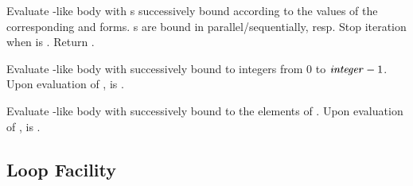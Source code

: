 \begin{LIST}{1cm}
  
  Evaluate -like body with s successively bound according
  to the values of the corresponding  and 
  forms. s are bound in parallel/sequentially, resp.
  Stop iteration when  is \T. Return .

  Evaluate -like body with  successively bound
  to integers from 0 to $\mbox{\VAR{integer}} - 1$. Upon evaluation of
  ,  is \NIL.

  Evaluate -like body with  successively bound
  to the elements of . Upon evaluation of
  ,  is \NIL.


\end{LIST}

\subsection{Loop Facility}

